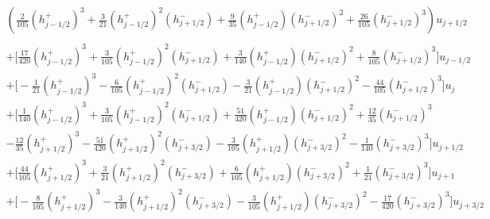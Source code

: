 \documentclass[12pt]{article}
\begin{document}
\begin{multline*}
\left(\frac{2}{105}\left(h^+_{j - 1/2} \right)^3 + \frac{3}{21} \left(h^+_{j - 1/2} \right)^2\left(h^-_{j + 1/2}\right) + \frac{9}{35} \left(h^+_{j - 1/2} \right)\left(h^-_{j + 1/2}\right)^2 +  \frac{26}{105}\left(h^-_{j + 1/2}\right)^3\right)u_{j+ 1/2}\\ \\
+\bigg[\frac{17}{420}\left(h^+_{j - 1/2}\right)^3 + \frac{3}{105} \left(h^+_{j - 1/2}\right)^2 \left(h^-_{j + 1/2}\right)
+  \frac{3}{140} \left(h^+_{j - 1/2}\right) \left(h^-_{j + 1/2}\right)^2 +  \frac{8}{105}\left(h^-_{j + 1/2}\right)^3 \bigg] u_{j - 1/2} \\
+ \bigg[-\frac{1}{21}\left(h^+_{j - 1/2}\right)^3 - \frac{6}{105} \left(h^+_{j - 1/2}\right)^2 \left(h^-_{j + 1/2}\right)
- \frac{3}{21} \left(h^+_{j - 1/2}\right) \left(h^-_{j + 1/2}\right)^2 - \frac{44}{105}  \left(h^-_{j + 1/2}\right)^3 \bigg] u_{j} \\
+
\bigg[ \frac{1}{140} \left(h^+_{j - 1/2}\right)^3 + \frac{3}{105} \left(h^+_{j - 1/2}\right)^2 \left(h^-_{j + 1/2}\right)
+ \frac{51}{420} \left(h^+_{j - 1/2}\right) \left(h^-_{j + 1/2}\right)^2 +   \frac{12}{35}\left(h^-_{j + 1/2}\right)^3 \\ - \frac{12}{35} \left(h^+_{j + 1/2} \right)^3  - \frac{51}{420}  \left(h^+_{j + 1/2} \right)^2\left(h^-_{j + 3/2}\right)   - \frac{3}{105}\left(h^+_{j + 1/2} \right)\left(h^-_{j + 3/2}\right)^2  - \frac{1}{140}\left(h^-_{j + 3/2}\right)^3 \bigg] u_{j + 1/2} \\
+\bigg[\frac{44}{105}\left(h^+_{j + 1/2} \right)^3 + \frac{3}{21} \left(h^+_{j + 1/2} \right)^2\left(h^-_{j + 3/2}\right) + \frac{6}{105} \left(h^+_{j + 1/2} \right)\left(h^-_{j + 3/2}\right)^2 + \frac{1}{21}\left(h^-_{j + 3/2}\right)^3 \bigg] u_{j +1} \\
+ \bigg[- \frac{8}{105}\left(h^+_{j + 1/2} \right)^3 - \frac{3}{140} \left(h^+_{j + 1/2} \right)^2\left(h^-_{j + 3/2}\right) - \frac{3}{105} \left(h^+_{j + 1/2} \right)\left(h^-_{j + 3/2}\right)^2 - \frac{17}{420} \left(h^-_{j + 3/2}\right)^3 \bigg] u_{j + 3/2} 
\end{multline*}
\end{document}
